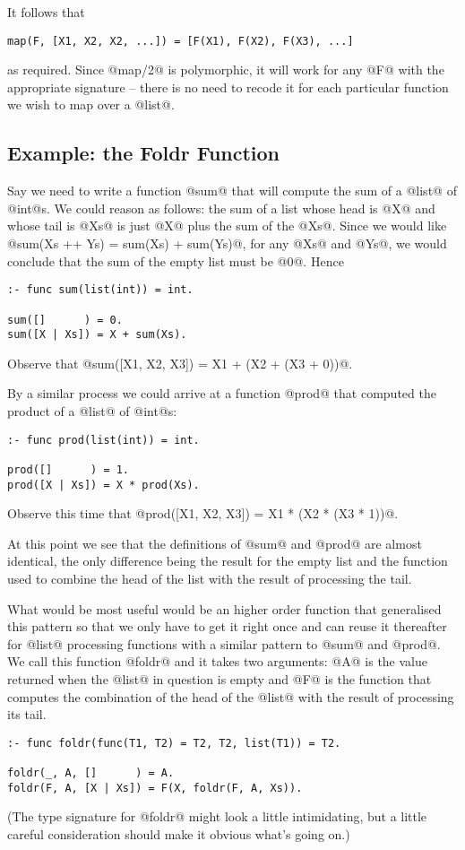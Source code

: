 It follows that
\begin{verbatim}
map(F, [X1, X2, X2, ...]) = [F(X1), F(X2), F(X3), ...]
\end{verbatim}
as required.  Since @map/2@ is polymorphic, it will work for any @F@
with the appropriate signature -- there is no need to recode it for each
particular function we wish to map over a @list@.

\subsection{Example: the Foldr Function}


Say we need to write a function @sum@ that will compute the sum of a
@list@ of @int@s.  We could reason as follows: the sum of a list whose
head is @X@ and whose tail is @Xs@ is just @X@ plus the sum of the @Xs@.
Since we would like @sum(Xs ++ Ys) = sum(Xs) + sum(Ys)@, for any @Xs@
and @Ys@, we would conclude that the sum of the empty list must be @0@.
Hence
\begin{verbatim}
:- func sum(list(int)) = int.

sum([]      ) = 0.
sum([X | Xs]) = X + sum(Xs).
\end{verbatim}
Observe that @sum([X1, X2, X3]) = X1 + (X2 + (X3 + 0))@.

By a similar process we could arrive at a function @prod@ that computed
the product of a @list@ of @int@s:
\begin{verbatim}
:- func prod(list(int)) = int.

prod([]      ) = 1.
prod([X | Xs]) = X * prod(Xs).
\end{verbatim}
Observe this time that @prod([X1, X2, X3]) = X1 * (X2 * (X3 * 1))@.

At this point we see that the definitions of @sum@ and @prod@ are almost
identical, the only difference being the result for the empty list and
the function used to combine the head of the list with the result of
processing the tail.

What would be most useful would be an higher order function that
generalised this pattern so that we only have to get it right once and
can reuse it thereafter for @list@ processing functions with a similar
pattern to @sum@ and @prod@.  We call this function @foldr@ and it takes
two arguments: @A@ is the value returned when the @list@ in question is
empty and @F@ is the function that computes the combination of the head
of the @list@ with the result of processing its tail.
\begin{verbatim}
:- func foldr(func(T1, T2) = T2, T2, list(T1)) = T2.

foldr(_, A, []      ) = A.
foldr(F, A, [X | Xs]) = F(X, foldr(F, A, Xs)).
\end{verbatim}
(The type signature for @foldr@ might look a little intimidating, but a
little careful consideration should make it obvious what's going on.)

